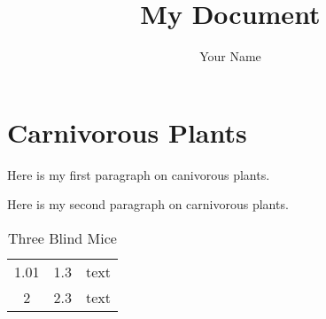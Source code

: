 \documentclass{article}
\begin{document}
\title{My Document}
\author{Your Name}
\maketitle

\tableofcontents

\section{Carnivorous Plants}

Here is my first paragraph on canivorous plants.

Here is my second paragraph
on carnivorous plants.

\begin{table}

\begin{center}

\begin{tabular}{ccl}
1.01 & 1.3 & text \\
2 & 2.3 & text \\ 
\end{tabular}

\caption{Three Blind Mice}
\label{tb:Xname}

\end{center}

\end{table}
\end{document}
